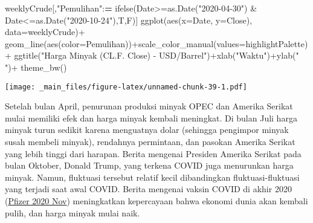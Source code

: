 \documentclass[
]{book}
\newenvironment{Shaded}{\begin{snugshade}}{\end{snugshade}}
\newcommand{\AttributeTok}[1]{\textcolor[rgb]{0.77,0.63,0.00}{#1}}
\newcommand{\ErrorTok}[1]{\textcolor[rgb]{0.64,0.00,0.00}{\textbf{#1}}}
\newcommand{\FunctionTok}[1]{\textcolor[rgb]{0.00,0.00,0.00}{#1}}
\newcommand{\NormalTok}[1]{#1}
\newcommand{\SpecialCharTok}[1]{\textcolor[rgb]{0.00,0.00,0.00}{#1}}
\newcommand{\StringTok}[1]{\textcolor[rgb]{0.31,0.60,0.02}{#1}}
\begin{document}
\begin{Shaded}
\begin{Highlighting}[]
\NormalTok{weeklyCrude[,}\StringTok{"Pemulihan"}\SpecialCharTok{:}\ErrorTok{=}
              \FunctionTok{ifelse}\NormalTok{(Date}\SpecialCharTok{\textgreater{}=}\FunctionTok{as.Date}\NormalTok{(}\StringTok{"2020{-}04{-}30"}\NormalTok{) }\SpecialCharTok{\&}\NormalTok{ Date}\SpecialCharTok{\textless{}=}\FunctionTok{as.Date}\NormalTok{(}\StringTok{"2020{-}10{-}24"}\NormalTok{),T,F)]}
\FunctionTok{ggplot}\NormalTok{(}\FunctionTok{aes}\NormalTok{(}\AttributeTok{x=}\NormalTok{Date, }\AttributeTok{y=}\NormalTok{Close),}
       \AttributeTok{data=}\NormalTok{weeklyCrude)}\SpecialCharTok{+}
  \FunctionTok{geom\_line}\NormalTok{(}\FunctionTok{aes}\NormalTok{(}\AttributeTok{color=}\StringTok{\textasciigrave{}}\AttributeTok{Pemulihan}\StringTok{\textasciigrave{}}\NormalTok{))}\SpecialCharTok{+}\FunctionTok{scale\_color\_manual}\NormalTok{(}\AttributeTok{values=}\NormalTok{highlightPalette)}\SpecialCharTok{+}
  \FunctionTok{ggtitle}\NormalTok{(}\StringTok{"Harga Minyak (CL.F. Close) {-} USD/Barrel"}\NormalTok{)}\SpecialCharTok{+}\FunctionTok{xlab}\NormalTok{(}\StringTok{"Waktu"}\NormalTok{)}\SpecialCharTok{+}\FunctionTok{ylab}\NormalTok{(}\StringTok{" "}\NormalTok{)}\SpecialCharTok{+}
  \FunctionTok{theme\_bw}\NormalTok{()}
\end{Highlighting}
\end{Shaded}

\texttt{[image: \_main\_files/figure-latex/unnamed-chunk-39-1.pdf]}

Setelah bulan April, penurunan produksi minyak OPEC dan Amerika Serikat mulai memiliki efek dan harga minyak kembali meningkat. Di bulan Juli harga minyak turun sedikit karena menguatnya dolar (sehingga pengimpor minyak susah membeli minyak), rendahnya permintaan, dan pasokan Amerika Serikat yang lebih tinggi dari harapan. Berita mengenai Presiden Amerika Serikat pada bulan Oktober, Donald Trump, yang terkena COVID juga menurunkan harga minyak. Namun, fluktuasi tersebut relatif kecil dibandingkan fluktuasi-fluktuasi yang terjadi saat awal COVID. Berita mengenai vaksin COVID di akhir 2020 (\protect\hyperlink{ref-pfizer_2020}{Pfizer 2020 Nov}) meningkatkan kepercayaan bahwa ekonomi dunia akan kembali pulih, dan harga minyak mulai naik.
\end{document}
